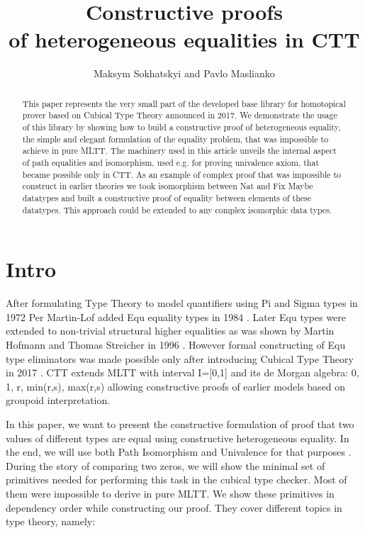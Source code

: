 \documentclass{svproc}
\begin{document}
\title{Constructive proofs \\
       of heterogeneous equalities in CTT}
\author{Maksym Sokhatskyi and Pavlo Maslianko}

\maketitle

\begin{abstract}
This paper represents the very small part of the developed base library for homotopical
prover based on Cubical Type Theory announced in 2017. We demonstrate the usage of this library by
showing how to build a constructive proof of heterogeneous equality, the simple
and elegant formulation of the equality problem, that was impossible to achieve in pure MLTT.
The machinery used in this article unveils the internal aspect of path equalities and isomorphism,
used e.g. for proving univalence axiom, that became possible only in CTT.
As an example of complex proof that was impossible to construct in earlier theories
we took isomorphism between Nat and Fix Maybe datatypes and built a constructive
proof of equality between elements of these datatypes. This approach could be extended
to any complex isomorphic data types.
\end{abstract}


\section{Intro}

After formulating Type Theory to model quantifiers using Pi and Sigma types in 1972 \cite{Lof72}
Per Martin-Lof added Equ equality types in 1984 \cite{Lof84}. Later Equ types were extended
to non-trivial structural higher equalities as was shown by Martin Hofmann
and Thomas Streicher in 1996 \cite{Hofmann96}. However formal constructing of Equ type
eliminators was made possible only after introducing Cubical Type Theory in 2017 \cite{Mortberg17}.
CTT extends MLTT with interval I=[0,1] and its de Morgan algebra: 0, 1, r, min(r,s), max(r,s)
allowing constructive proofs of earlier models based on groupoid interpretation.

In this paper, we want to present the constructive formulation of proof
that two values of different types are equal using constructive heterogeneous equality.
In the end, we will use both Path Isomorphism and Univalence for that purposes \cite{HoTT}.
During the story of comparing two zeros, we will show the minimal set of primitives needed
for performing this task in the cubical type checker. Most of
them were impossible to derive in pure MLTT. We show these primitives in dependency order
while constructing our proof. They cover different topics in type theory, namely:
\end{document}
